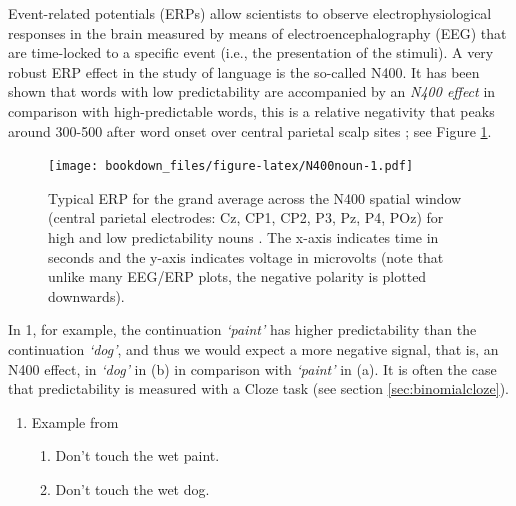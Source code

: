 \documentclass[12pt,]{krantz}
\providecommand{\tightlist}{%
  \setlength{\itemsep}{0pt}\setlength{\parskip}{0pt}}
\theoremstyle{definition}
\theoremstyle{definition}
\theoremstyle{definition}
\theoremstyle{remark}
\begin{document}
Event-related potentials (ERPs) allow scientists to observe electrophysiological responses in the brain measured by means of electroencephalography (EEG) that are time-locked to a specific event (i.e., the presentation of the stimuli). A very robust ERP effect in the study of language is the so-called N400. It has been shown that words with low predictability are accompanied by an \emph{N400 effect} in comparison with high-predictable words, this is a relative negativity that peaks around 300-500 after word onset over central parietal scalp sites \citetext{\citealp[first noticed in][]{kutasReadingSenselessSentences1980}; \citealp[for semantic anomalies and in][ for low predictable word]{kutasBrainPotentialsReading1984}; \citealp[for a review:][]{kutasThirtyYearsCounting2011}}; see Figure \ref{fig:N400noun}.



\begin{figure}
\centering
\texttt{[image: bookdown\_files/figure-latex/N400noun-1.pdf]}
\caption{\label{fig:N400noun}Typical ERP for the grand average across the N400 spatial window (central parietal electrodes: Cz, CP1, CP2, P3, Pz, P4, POz) for high and low predictability nouns \citep[specifically from the constraining context of the experiment reported in][]{nicenboim_vasishth_rosler_2020}. The x-axis indicates time in seconds and the y-axis indicates voltage in microvolts (note that unlike many EEG/ERP plots, the negative polarity is plotted downwards).}
\end{figure}

In 1, for example, the continuation \emph{`paint'} has higher predictability than the continuation \emph{`dog'}, and thus we would expect a more negative signal, that is, an N400 effect, in \emph{`dog'} in (b) in comparison with \emph{`paint'} in (a). It is often the case that predictability is measured with a Cloze task (see section \ref{sec:binomialcloze}).

\begin{enumerate}
\def\labelenumi{\arabic{enumi}.}
\tightlist
\item
  Example from \citet{kutasBrainPotentialsReading1984}

  \begin{enumerate}
  \def\labelenumii{\alph{enumii}.}
  \tightlist
  \item
    Don't touch the wet paint.
  \item
    Don't touch the wet dog.
  \end{enumerate}
\end{enumerate}
\end{document}
